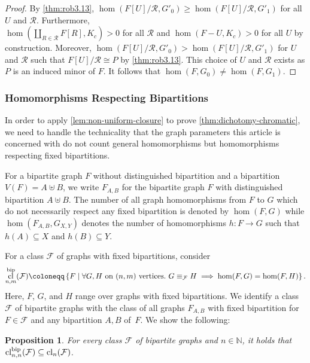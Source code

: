 \documentclass[11pt, DIV=15]{scrarticle}
\theoremstyle{definition}
\theoremstyle{plain}
\newtheorem{proposition}[definition]{Proposition}
\theoremstyle{remark}
\DeclareMathOperator{\cl}{cl}
\begin{document}
\begin{proof}
		By \cref{thm:rob3.13},
		$\hom(F[U]/\mathcal{R}, G'_0) \geq \hom(F[U]/\mathcal{R}, G'_1)$
		for all $U$ and $\mathcal{R}$.
		Furthermore,\\ $\hom(\coprod_{R \in \mathcal{R}} F[R], K_c) > 0$ for all $\mathcal{R}$ and $\hom(F - U, K_c)  > 0$ for all $U$ by construction.
		Moreover, $\hom(F[U]/\mathcal{R}, G'_0) > \hom(F[U]/\mathcal{R}, G'_1)$ for $U$ and $\mathcal{R}$ such that $F[U]/\mathcal{R} \cong P$ by \cref{thm:rob3.13}.
		This choice of $U$ and $\mathcal{R}$ exists as $P$ is an induced minor of $F$.
		It follows that $\hom(F, G_0) \neq \hom(F, G_1)$.
	\end{proof}
	
	
	\subsubsection{Homomorphisms Respecting Bipartitions}
	\label{sec:bipartite-respecting}
	
	In order to apply \cref{lem:non-uniform-closure} 
	to prove \cref{thm:dichotomy-chromatic},
	we need to handle the technicality that the graph parameters this article is concerned with do not count general homomorphisms but homomorphisms respecting fixed bipartitions.
	
	For a bipartite graph $F$ without distinguished bipartition and a bipartition $V(F) = A \uplus B$,
	we write $F_{A, B}$ for the bipartite graph $F$ with distinguished bipartition $A \uplus B$.
	The number of all graph homomorphisms
	from $F$ to $G$  which do not necessarily respect any fixed bipartition is denoted by $\hom(F, G)$ while $\hom(F_{A, B}, G_{X, Y})$ denotes the number of homomorphisms $h \colon F \to G$ such that $h(A) \subseteq X$ and $h(B) \subseteq Y$.
	
	
	For a class $\mathcal{F}$ of graphs with fixed bipartitions, consider
	\[
		\cl_{n,m}^{\textup{bip}}(\mathcal{F})
		\coloneqq \left\{F \mid \forall G, H \text{ on $(n,m)$ vertices}.\ G \equiv_{\mathcal{F}} H \implies \hom(F, G) = \hom(F,H) \right\}.
	\]
	Here, $F$, $G$, and $H$ range over graphs with fixed bipartitions.
	We identify a class $\mathcal{F}$ of bipartite graphs with the class of all graphs $F_{A,B}$ with fixed bipartition for $F \in \mathcal{F}$ and any bipartition $A,B$ of~$F$. 
	We show the following:
	\begin{proposition}\label{prop:bip-cl}
		For every class $\mathcal{F}$ of bipartite graphs
		and $n \in \mathbb{N}$,
		it holds that
		$\cl_{n,n}^{\textup{bip}}(\mathcal{F}) \subseteq \cl_n(\mathcal{F})$.
	\end{proposition}
	
\end{document}
